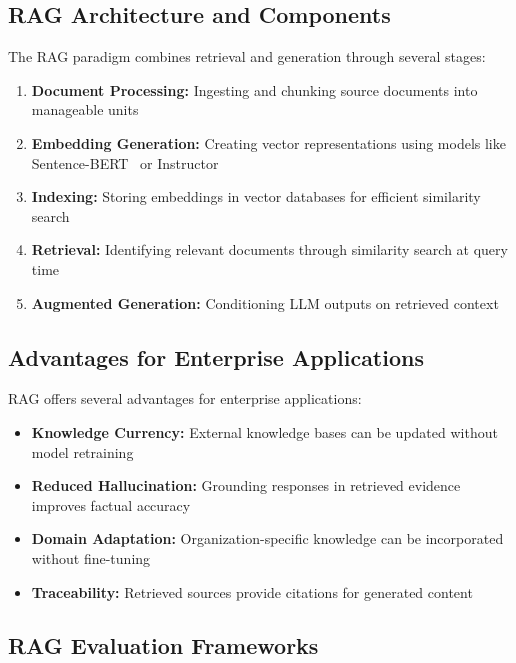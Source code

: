 \subsection{RAG Architecture and Components}

The RAG paradigm combines retrieval and generation through several stages:

\begin{enumerate}[leftmargin=*]
    \item \textbf{Document Processing:} Ingesting and chunking source documents into manageable units
    \item \textbf{Embedding Generation:} Creating vector representations using models like Sentence-BERT~\cite{reimers2019sbert} or Instructor~\cite{su2023instructor}
    \item \textbf{Indexing:} Storing embeddings in vector databases for efficient similarity search
    \item \textbf{Retrieval:} Identifying relevant documents through similarity search at query time
    \item \textbf{Augmented Generation:} Conditioning LLM outputs on retrieved context
\end{enumerate}

\subsection{Advantages for Enterprise Applications}

RAG offers several advantages for enterprise applications:

\begin{itemize}[leftmargin=*]
    \item \textbf{Knowledge Currency:} External knowledge bases can be updated without model retraining
    \item \textbf{Reduced Hallucination:} Grounding responses in retrieved evidence improves factual accuracy~\cite{gao2023rag_survey}
    \item \textbf{Domain Adaptation:} Organization-specific knowledge can be incorporated without fine-tuning
    \item \textbf{Traceability:} Retrieved sources provide citations for generated content
\end{itemize}

\subsection{RAG Evaluation Frameworks}

